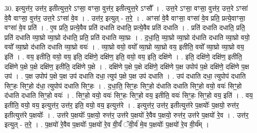 \documentclass[17pt]{extarticle}
\begin{document}
30. इत्युत्त॑र॒ उत्त॑र॒ इतीत्युत्त॒रे ऽꣳसा॒ वꣳसा॒ वुत्त॑र॒ इतीत्युत्त॒रे ऽꣳसौ᳚ । . उत्त॒रे ऽꣳसा॒ वꣳसा॒ वुत्त॑र॒ उत्त॒रे ऽꣳसा॑ वे॒वै वाꣳसा॒ वुत्त॑र॒ उत्त॒रे ऽꣳसा॑ वे॒व । . उत्त॑र॒ इत्युत् - त॒रे॒ । . अꣳसा॑ वे॒वै वाꣳसा॒ वꣳसा॑ वे॒व प्रति॒ प्रत्ये॒वाꣳसा॒ वꣳसा॑ वे॒व प्रति॑ । . ए॒व प्रति॒ प्रत्ये॒वैव प्रति॑ दधाति दधाति॒ प्रत्ये॒वैव प्रति॑ दधाति । . प्रति॑ दधाति दधाति॒ प्रति॒ प्रति॑ दधाति व्या॒घ्रो व्या॒घ्रो द॑धाति॒ प्रति॒ प्रति॑ दधाति व्या॒घ्रः । . द॒धा॒ति॒ व्या॒घ्रो व्या॒घ्रो द॑धाति दधाति व्या॒घ्रो वयो॒ वयो᳚ व्या॒घ्रो द॑धाति दधाति व्या॒घ्रो वयः॑ । . व्या॒घ्रो वयो॒ वयो᳚ व्या॒घ्रो व्या॒घ्रो वय॒ इतीति॒ वयो᳚ व्या॒घ्रो व्या॒घ्रो वय॒ इति॑ । . वय॒ इतीति॒ वयो॒ वय॒ इति॒ दक्षि॑णे॒ दक्षि॑ण॒ इति॒ वयो॒ वय॒ इति॒ दक्षि॑णे । . इति॒ दक्षि॑णे॒ दक्षि॑ण॒ इतीति॒ दक्षि॑णे प॒क्षे प॒क्षे दक्षि॑ण॒ इतीति॒ दक्षि॑णे प॒क्षे । . दक्षि॑णे प॒क्षे प॒क्षे दक्षि॑णे॒ दक्षि॑णे प॒क्ष उपोप॑ प॒क्षे दक्षि॑णे॒ दक्षि॑णे प॒क्ष उप॑ । . प॒क्ष उपोप॑ प॒क्षे प॒क्ष उप॑ दधाति दधा॒ त्युप॑ प॒क्षे प॒क्ष उप॑ दधाति । . उप॑ दधाति दधा॒ त्युपोप॑ दधाति सिꣳ॒॒हः सिꣳ॒॒हो द॑धा॒ त्युपोप॑ दधाति सिꣳ॒॒हः । . द॒धा॒ति॒ सिꣳ॒॒हः सिꣳ॒॒हो द॑धाति दधाति सिꣳ॒॒हो वयो॒ वयः॑ सिꣳ॒॒हो द॑धाति दधाति सिꣳ॒॒हो वयः॑ । . सिꣳ॒॒हो वयो॒ वयः॑ सिꣳ॒॒हः सिꣳ॒॒हो वय॒ इतीति॒ वयः॑ सिꣳ॒॒हः सिꣳ॒॒हो वय॒ इति॑ । . वय॒ इतीति॒ वयो॒ वय॒ इत्युत्त॑र॒ उत्त॑र॒ इति॒ वयो॒ वय॒ इत्युत्त॑रे । . इत्युत्त॑र॒ उत्त॑र॒ इतीत्युत्त॑रे प॒क्षयोः᳚ प॒क्षयो॒ रुत्त॑र॒ इतीत्युत्त॑रे प॒क्षयोः᳚ । . उत्त॑रे प॒क्षयोः᳚ प॒क्षयो॒ रुत्त॑र॒ उत्त॑रे प॒क्षयो॑ रे॒वैव प॒क्षयो॒ रुत्त॑र॒ उत्त॑रे प॒क्षयो॑ रे॒व । . उत्त॑र॒ इत्युत् - त॒रे॒ । . प॒क्षयो॑ रे॒वैव प॒क्षयोः᳚ प॒क्षयो॑ रे॒व वी॒र्यं॑ ॅवी॒र्य॑ मे॒व प॒क्षयोः᳚ प॒क्षयो॑ रे॒व वी॒र्य᳚म् । \newline
\end{document}

